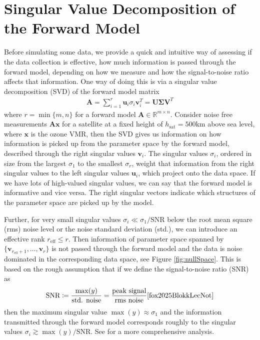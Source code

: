 \section{Singular Value Decomposition of the Forward Model}
Before simulating some data, we provide a quick and intuitive way of assessing if the data collection is effective, how much information is passed through the forward model, depending on how we measure and how the signal-to-noise ratio affects that information.
One way of doing this is via a singular value decomposition (SVD) of the forward model matrix
\begin{align}
	\bm{A} = \sum_{i =1}^{r} \bm{u}_i  \sigma_i \bm{v}^T_i = \bm{U} \bm{\Sigma} \bm{V}^T
\end{align}
where $r = \min\{m,n\}$ for a forward model $\bm{A} \in \mathbb{R}^{m \times n}$.
Consider noise free measurements $\bm{A}\bm{x}$ for a satellite at a fixed height of $h_{\text{sat}} = 500$km above sea level, where $\bm{x}$ is the ozone VMR, then the SVD gives us information on how information is picked up from the parameter space by the forward model, described through the right singular values $\bm{v}_i$.
The singular values $\sigma_i $, ordered in size from the largest $\sigma_1$ to the smallest $\sigma_{r}$, weight that information from the right singular values to the left singular values $\bm{u}_i$, which project onto the data space.
If we have lots of high-valued singular values, we can say that the forward model is informative and vice versa.
The right singular vectors indicate which structures of the parameter space are picked up by the model.

Further, for very small singular values $\sigma_i \ll \sigma_1/\text{SNR}$ below the root mean square (rms) noise level or the noise standard deviation (std.), we can introduce an effective rank $r_{\text{eff}} \leq r$.
Then information of parameter space spanned by $ \{\bm{v}_{r_{\text{eff}} +1}, \dots ,\bm{v}_r \}$ is not passed through the forward model and the data is noise dominated in the corresponding data space, see Figure \ref{fig:nullSpace}.
This is based on the rough assumption that if we define the signal-to-noise ratio (SNR) as
\begin{align}
	\text{SNR} \coloneqq \frac{\max(y)}{\text{std. noise}} = \frac{\text{peak signal}}{\text{rms noise}} \text{\cite{fox2025BlokkLecNot}}
\end{align}
then the maximum singular value $\max(y) \approx \sigma_1$ and the information transmitted through the forward model corresponds roughly to the singular values $\sigma_i \gtrsim \max(y)/ \text{SNR}$.
See \cite{tan2016LecNot} for a more comprehensive analysis.

